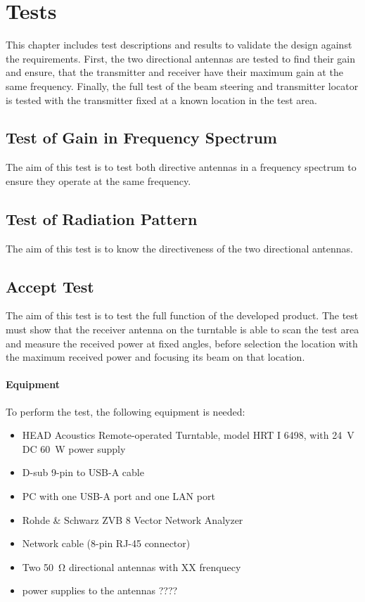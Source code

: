 \chapter{Tests}
This chapter includes test descriptions and results to validate the design against the requirements. First, the two directional antennas are tested to find their gain and ensure, that the transmitter and receiver have their maximum gain at the same frequency. Finally, the full test of the beam steering and transmitter locator is tested with the transmitter fixed at a known location in the test area.

\section{Test of Gain in Frequency Spectrum} 
The aim of this test is to test both directive antennas in a frequency spectrum to ensure they operate at the same frequency.

\section{Test of Radiation Pattern}
The aim of this test is to know the directiveness of the two directional antennas.

\section{Accept Test}
The aim of this test is to test the full function of the developed product. The test must show that the receiver antenna on the turntable is able to scan the test area and measure the received power at fixed angles, before selection the location with the maximum received power and focusing its beam on that location.

\subsubsection{Equipment}
To perform the test, the following equipment is needed:

\begin{itemize}
    \item HEAD Acoustics Remote-operated Turntable, model HRT I 6498, with \SI{24}{\volt} DC \SI{60}{W} power supply
    \item D-sub 9-pin to USB-A cable
    \item PC with one USB-A port and one LAN port
    \item Rohde \& Schwarz ZVB 8 Vector Network Analyzer
    \item Network cable (8-pin RJ-45 connector)
    \item Two \SI{50}{\ohm} directional antennas with XX frenquecy
    \item power supplies to the antennas ????
\end{itemize}

